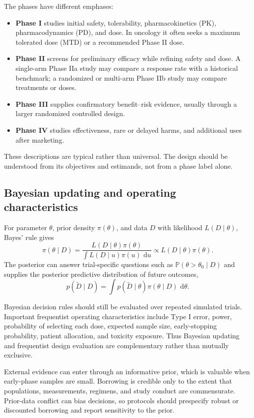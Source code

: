 \documentclass[12pt,oneside]{book}
\numberwithin{equation}{section}
\theoremstyle{definition}
\theoremstyle{plain}
\theoremstyle{remark}
\newcommand{\Prob}{\mathbb{P}}
\newcommand{\dd}{\,\mathrm{d}}
\begin{document}
The phases have different emphases:
\begin{itemize}
    \item \textbf{Phase I} studies initial safety, tolerability,
    pharmacokinetics (PK), pharmacodynamics (PD), and dose.  In oncology it
    often seeks a maximum tolerated dose (MTD) or a recommended Phase II dose.
    \item \textbf{Phase II} screens for preliminary efficacy while refining
    safety and dose.  A single-arm Phase IIa study may compare a response rate
    with a historical benchmark; a randomized or multi-arm Phase IIb study may
    compare treatments or doses.
    \item \textbf{Phase III} supplies confirmatory benefit--risk evidence,
    usually through a larger randomized controlled design.
    \item \textbf{Phase IV} studies effectiveness, rare or delayed harms, and
    additional uses after marketing.
\end{itemize}
These descriptions are typical rather than universal.  The design should be
understood from its objectives and estimands, not from a phase label alone.

\subsection{Bayesian updating and operating characteristics}

For parameter $\theta$, prior density $\pi(\theta)$, and data $D$ with
likelihood $L(D\mid\theta)$, Bayes' rule gives
\[
 \pi(\theta\mid D)
 =\frac{L(D\mid\theta)\pi(\theta)}
 {\int L(D\mid u)\pi(u)\,\dd u}
 \propto L(D\mid\theta)\pi(\theta).
\]
The posterior can answer trial-specific questions such as
$\Prob(\theta>\theta_0\mid D)$ and supplies the posterior predictive
distribution of future outcomes,
\[
 p(\widetilde D\mid D)
 =\int p(\widetilde D\mid\theta)\pi(\theta\mid D)\,\dd\theta.
\]

Bayesian decision rules should still be evaluated over repeated simulated
trials.  Important frequentist operating characteristics include Type I error,
power, probability of selecting each dose, expected sample size, early-stopping
probability, patient allocation, and toxicity exposure.  Thus Bayesian updating
and frequentist design evaluation are complementary rather than mutually
exclusive.

External evidence can enter through an informative prior, which is valuable
when early-phase samples are small.  Borrowing is credible only to the extent
that populations, measurements, regimens, and study conduct are commensurate.
Prior-data conflict can bias decisions, so protocols should prespecify robust or
discounted borrowing and report sensitivity to the prior.
\end{document}
